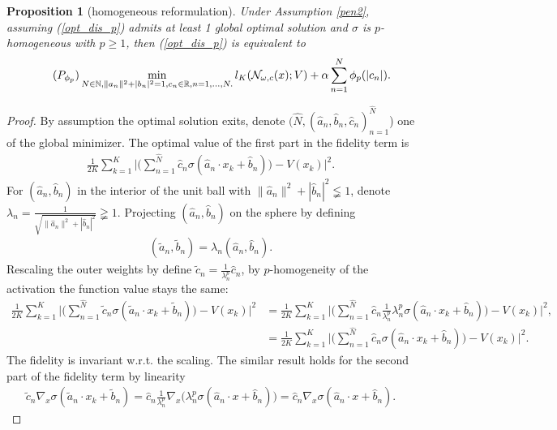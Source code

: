 \documentclass[12pt,fleqn]{amsart}
\newtheorem{proposition}[theorem]{Proposition}
\theoremstyle{definition}
\begin{document}
\begin{proposition}[homogeneous reformulation]
Under Assumption \ref{pen2}, assuming (\ref{opt_dis_p}) admits at least 1 global optimal solution and $\sigma$ is $p$-homogeneous with $p \ge 1$, then (\ref{opt_dis_p}) is equivalent to 
\begin{equation}
\label{discrete nonconvex problem}
\tag{$P_{\phi_p}$}
		\min_{N \in \mathbb{N}, \|a_n\|^2 + |b_n|^2 =  1 , c_n\in \mathbb{R} , n = 1, \dots, N.} l_K(\mathcal{N}_{\omega, c}(x) ;V) + \alpha \sum_{n = 1}^N \phi_p(|c_n|).
\end{equation}
\end{proposition}
\begin{proof}
    By assumption the optimal solution exits, denote $(\hat{N}, (\hat{a}_n, \hat{b}_n, \hat{c}_n)_{n = 1}^{\hat{N}}$) one of the global minimizer. The optimal value of the first part in the fidelity term is 
	\begin{align*}
		 \frac{1}{2K} \sum_{k = 1}^K \bigg|\bigg( \sum_{n = 1}^{\hat{N}} \hat{c}_n \sigma(\hat{a}_n \cdot x_k + \hat{b}_n) \bigg) - V(x_k) \bigg|^2.
	\end{align*}
    For $(\hat{a}_n, \hat{b}_n)$ in the interior of the unit ball with $\|\hat{a}_n\|^2 + |\hat{b}_n|^2 \lneqq  1$, denote $\lambda_n =\frac{1}{ \sqrt{ \|\hat{a}_n\|^2 + |\hat{b}_n|^2} }\gneqq  1$. Projecting $(\hat{a}_n, \hat{b}_n)$ on the sphere by defining
        \begin{align*}
            (\tilde{a}_n,\tilde{b}_n) = \lambda_n (\hat{a}_n, \hat{b}_n).
        \end{align*}
    Rescaling the outer weights by define $\tilde{c}_n = \frac{1}{\lambda_n^p} \hat{c}_n$, by $p$-homogeneity of the activation the function value stays the same:  
	\begin{align*}
		\frac{1}{2K} \sum_{k = 1}^K \bigg|\bigg( \sum_{n = 1}^{\hat{N}} \tilde{c}_n \sigma(\tilde{a}_n \cdot x_k + \tilde{b}_n) \bigg) - V(x_k) \bigg|^2 
		&= \frac{1}{2K} \sum_{k = 1}^K \bigg|\bigg(\sum_{n = 1}^{\hat{N}} \hat{c}_n \frac{1}{\lambda_n^p}  \lambda_n^p \sigma(\hat{a}_n \cdot x_k + \hat{b}_n) \bigg) - V(x_k) \bigg|^2, \\
		&= \frac{1}{2K} \sum_{k = 1}^K \bigg|\bigg( \sum_{n = 1}^{\hat{N}} \hat{c}_n \sigma(\hat{a}_n \cdot x_k + \hat{b}_n) \bigg) - V(x_k) \bigg|^2.
	\end{align*}
    The fidelity is invariant w.r.t. the scaling. The similar result holds for the second part of the fidelity term by linearity
	\begin{align*}
		\tilde{c}_n \nabla_x \sigma (\tilde{a}_n \cdot x_k + \tilde{b}_n) = \hat{c}_n \frac{1}{\lambda_n^p} \nabla_x \bigg(\lambda_n^p \sigma(\hat{a}_n \cdot x+ \hat{b}_n) \bigg) = \hat{c}_n \nabla_x \sigma(\hat{a}_n \cdot x + \hat{b}_n).
	\end{align*} 
	

\end{proof}
\end{document}

